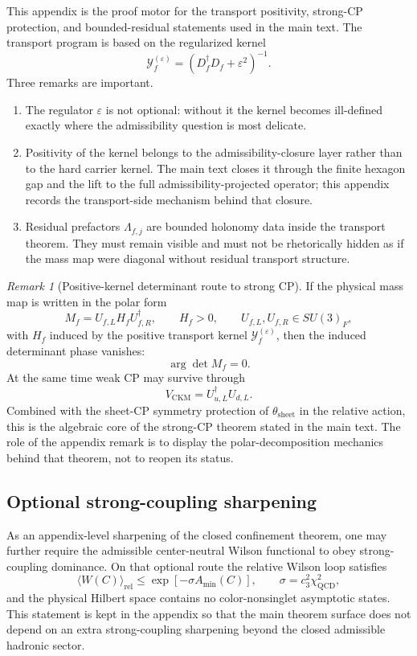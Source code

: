 \documentclass[11pt,a4paper]{article}
\theoremstyle{definition}
\theoremstyle{remark}
\newtheorem*{remark}{Remark}
\newcommand{\cthree}{c_3}
\newcommand{\QCD}{\mathrm{QCD}}
\begin{document}
This appendix is the proof motor for the transport positivity, strong-CP protection, and bounded-residual statements used in the main text. The transport program is based on the regularized kernel
\[
\mathcal Y_f^{(\varepsilon)}=(D_f^\dagger D_f+\varepsilon^2)^{-1}.
\]
Three remarks are important.
\begin{enumerate}[leftmargin=1.5em, topsep=3pt, itemsep=3pt]
    \item The regulator $\varepsilon$ is not optional: without it the kernel becomes ill-defined exactly where the admissibility question is most delicate.
    \item Positivity of the kernel belongs to the admissibility-closure layer rather than to the hard carrier kernel. The main text closes it through the finite hexagon gap and the lift to the full admissibility-projected operator; this appendix records the transport-side mechanism behind that closure.
    \item Residual prefactors $\Lambda_{f,j}$ are bounded holonomy data inside the transport theorem. They must remain visible and must not be rhetorically hidden as if the mass map were diagonal without residual transport structure.
\end{enumerate}

\begin{remark}[Positive-kernel determinant route to strong CP]
If the physical mass map is written in the polar form
\[
M_f=U_{f,L}H_fU_{f,R}^\dagger,
\qquad
H_f>0,
\qquad
U_{f,L},U_{f,R}\in SU(3)_F,
\]
with $H_f$ induced by the positive transport kernel $\mathcal Y_f^{(\varepsilon)}$, then the induced determinant phase vanishes:
\[
\arg\det M_f=0.
\]
At the same time weak CP may survive through
\[
V_{\mathrm{CKM}}=U_{u,L}^\dagger U_{d,L}.
\]
Combined with the sheet-CP symmetry protection of $\theta_{\mathrm{sheet}}$ in the relative action, this is the algebraic core of the strong-CP theorem stated in the main text. The role of the appendix remark is to display the polar-decomposition mechanics behind that theorem, not to reopen its status.
\end{remark}

\subsection{Optional strong-coupling sharpening}

As an appendix-level sharpening of the closed confinement theorem, one may further require the
admissible center-neutral Wilson functional to obey strong-coupling dominance. On that optional
route the relative Wilson loop satisfies
\[
\langle W(C)\rangle_{\mathrm{rel}}
\le
\exp[-\sigma A_{\min}(C)],
\qquad
\sigma=\cthree^2\chi_{\QCD}^2,
\]
and the physical Hilbert space contains no color-nonsinglet asymptotic states. This statement is
kept in the appendix so that the main theorem surface does not depend on an extra strong-coupling
sharpening beyond the closed admissible hadronic sector.
\end{document}
